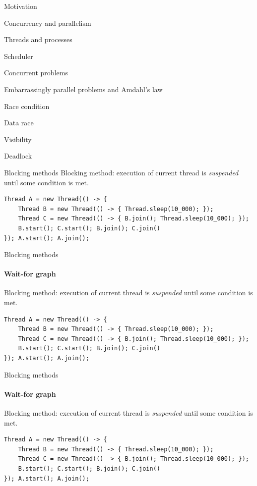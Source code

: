 \begin{section}{Motivation}
\begin{section}{Concurrency and parallelism}
\begin{section}{Threads and processes}
\begin{section}{Scheduler}
\begin{section}{Concurrent problems}
\begin{subsection}{Embarrassingly parallel problems and Amdahl's law}
\begin{subsection}{Race condition}
\begin{subsection}{Data race}
\begin{subsection}{Visibility}
\begin{subsection}{Deadlock}
\begin{frame}[t,fragile]{Blocking methods}
Blocking method: execution of current thread is \textit{suspended} until some condition is met.

\begin{verbatim}
Thread A = new Thread(() -> { 
    Thread B = new Thread(() -> { Thread.sleep(10_000); });
    Thread C = new Thread(() -> { B.join(); Thread.sleep(10_000); });
    B.start(); C.start(); B.join(); C.join()
}); A.start(); A.join();
\end{verbatim}

\pause

\end{frame}


\begin{frame}{Blocking methods}
\framesubtitle{Wait-for graph}

Blocking method: execution of current thread is \textit{suspended} until some condition is met.

\begin{verbatim}
Thread A = new Thread(() -> { 
    Thread B = new Thread(() -> { Thread.sleep(10_000); });
    Thread C = new Thread(() -> { B.join(); Thread.sleep(10_000); });
    B.start(); C.start(); B.join(); C.join()
}); A.start(); A.join();
\end{verbatim}

\end{frame}

\begin{frame}{Blocking methods}
\framesubtitle{Wait-for graph}

Blocking method: execution of current thread is \textit{suspended} until some condition is met.

\begin{verbatim}
Thread A = new Thread(() -> { 
    Thread B = new Thread(() -> { Thread.sleep(10_000); });
    Thread C = new Thread(() -> { B.join(); Thread.sleep(10_000); });
    B.start(); C.start(); B.join(); C.join()
}); A.start(); A.join();
\end{verbatim}


\end{frame}
\end{subsection}
\end{subsection}
\end{subsection}
\end{subsection}
\end{subsection}
\end{section}
\end{section}
\end{section}
\end{section}
\end{section}
